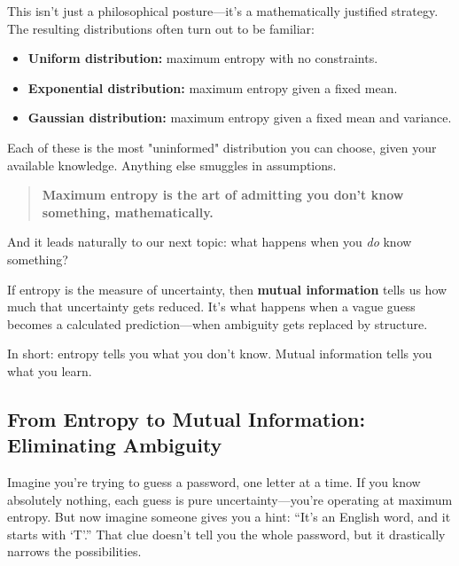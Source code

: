 This isn’t just a philosophical posture—it’s a mathematically justified strategy. The resulting distributions often turn out to be familiar:

\begin{itemize}
  \item \textbf{Uniform distribution:} maximum entropy with no constraints.
  \item \textbf{Exponential distribution:} maximum entropy given a fixed mean.
  \item \textbf{Gaussian distribution:} maximum entropy given a fixed mean and variance.
\end{itemize}



Each of these is the most "uninformed" distribution you can choose, given your available knowledge. Anything else smuggles in assumptions.

\begin{quote}
\textbf{Maximum entropy is the art of admitting you don't know something, mathematically.}
\end{quote}

And it leads naturally to our next topic: what happens when you \emph{do} know something?

If entropy is the measure of uncertainty, then \textbf{mutual information} tells us how much that uncertainty gets reduced. It's what happens when a vague guess becomes a calculated prediction—when ambiguity gets replaced by structure.

In short: entropy tells you what you don't know. Mutual information tells you what you learn.











\subsection{From Entropy to Mutual Information: Eliminating Ambiguity}

Imagine you’re trying to guess a password, one letter at a time. If you know absolutely nothing, each guess is pure uncertainty—you’re operating at maximum entropy. But now imagine someone gives you a hint: “It’s an English word, and it starts with ‘T’.” That clue doesn’t tell you the whole password, but it drastically narrows the possibilities.






